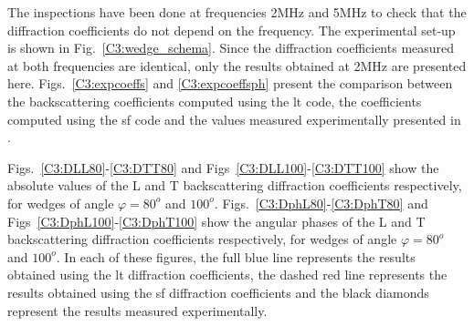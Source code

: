 The inspections have been done at frequencies 2MHz and 5MHz to check that the diffraction coefficients do not depend on the frequency.  The experimental set-up is shown in Fig.~\ref{C3:wedge_schema}. Since the diffraction coefficients measured at both frequencies are identical, only the results obtained at 2MHz are presented here. Figs.~\ref{C3:expcoeffs} and \ref{C3:expcoeffsph} present the comparison between the backscattering coefficients computed using the \acrshort{lt} code, the coefficients computed using the \acrshort{sf} code and the values measured experimentally presented in \cite{ChapmanBurch}.

Figs.~\ref{C3:DLL80}-\ref{C3:DTT80} and Figs~\ref{C3:DLL100}-\ref{C3:DTT100} show the absolute values of the L and T backscattering diffraction coefficients respectively, for wedges of angle $\varphi=80^o$ and $100^o$. Figs.~\ref{C3:DphL80}-\ref{C3:DphT80} and Figs~\ref{C3:DphL100}-\ref{C3:DphT100} show the angular phases of the L and T backscattering diffraction coefficients respectively, for wedges of angle $\varphi=80^o$ and $100^o$. In each of these figures, the full blue line represents the results obtained using the \acrshort{lt} diffraction coefficients, the dashed red line represents the results obtained using the \acrshort{sf} diffraction coefficients and the black diamonds represent the results measured experimentally.

